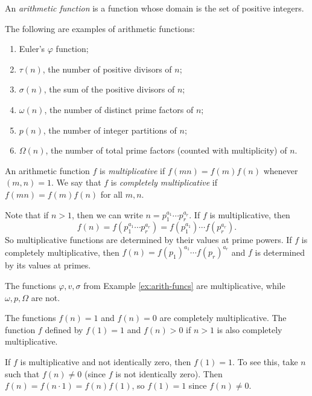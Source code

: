 \begin{definition}
  An \emph{arithmetic function} is a
  function whose domain is the set of
  positive integers.
\end{definition}

\begin{example}\label{ex:arith-funcs}
  The following are examples of
  arithmetic functions:
  \begin{enumerate}
    \item Euler's $\varphi$ function;
    \item $\tau(n)$, the number of
      positive divisors of $n$;
    \item $\sigma(n)$, the sum of
      the positive divisors of $n$;
    \item $\omega(n)$, the number of
      distinct prime factors of $n$;
    \item $p(n)$, the number of
      integer partitions of $n$;
    \item $\Omega(n)$, the number of
      total prime factors (counted with
      multiplicity) of $n$.
  \end{enumerate}
\end{example}

\begin{definition}
  An arithmetic function
  $f$ is \emph{multiplicative} if
  $f(mn) = f(m) f(n)$ whenever
  $(m, n) = 1$.
  We say that $f$ is \emph{completely multiplicative}
  if $f(mn) = f(m) f(n)$ for all
  $m, n$.
\end{definition}

\begin{remark}
  Note that if $n > 1$, then we can write
  $n = p_1^{a_1} \cdots p_r^{a_r}$.
  If $f$ is multiplicative, then
  \[
    f(n) = f(p_1^{a_1} \cdots p_r^{a_r})
    = f(p_1^{a_1}) \cdots f(p_r^{a_r}).
  \]
  So multiplicative functions are
  determined by their values at
  prime powers. If
  $f$ is completely multiplicative,
  then $f(n) = f(p_1)^{a_1} \cdots f(p_r)^{a_r}$
  and $f$ is determined by its values
  at primes.
\end{remark}

\begin{example}
  The functions $\varphi, v, \sigma$
  from Example \ref{ex:arith-funcs}
  are multiplicative, while
  $\omega, p, \Omega$ are not.
\end{example}

\begin{example}
  The functions $f(n) = 1$ and $f(n) = 0$
  are completely multiplicative. The
  function $f$ defined by
  $f(1) = 1$ and $f(n) > 0$ if $n > 1$
  is also completely multiplicative.
\end{example}

\begin{remark}
  If $f$ is multiplicative and not
  identically zero, then $f(1) = 1$.
  To see this, take $n$ such
  that $f(n) \ne 0$ (since $f$ is not
  identically zero). Then
  $f(n) = f(n \cdot 1) = f(n) f(1)$, so
  $f(1) = 1$ since $f(n) \ne 0$.
\end{remark}
